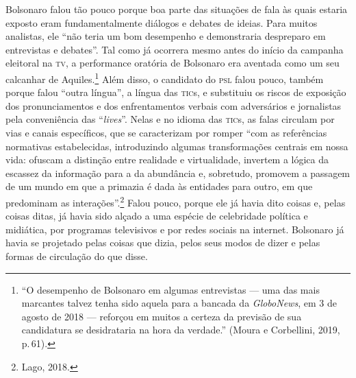 Bolsonaro falou tão pouco porque boa parte das situações de fala às
quais estaria exposto eram fundamentalmente diálogos e debates de
ideias. Para muitos analistas, ele ``não teria um bom desempenho e
demonstraria despreparo em entrevistas e debates''. Tal como já ocorrera
mesmo antes do início da campanha eleitoral na \textsc{tv}, a performance
oratória de Bolsonaro era aventada como um seu calcanhar de
Aquiles.\footnote{``O desempenho de Bolsonaro em algumas entrevistas ---
  uma das mais marcantes talvez tenha sido aquela para a bancada da
  \emph{GloboNews}, em 3 de agosto de 2018 --- reforçou em muitos a
  certeza da previsão de sua candidatura se desidrataria na hora da
  verdade.'' (Moura e Corbellini, 2019, p.\,61).} Além disso, o
candidato do \textsc{psl} falou pouco, também porque falou ``outra língua'', a
língua das \textsc{tic}s, e substituiu os riscos de exposição dos
pronunciamentos e dos enfrentamentos verbais com adversários e
jornalistas pela conveniência das ``\emph{lives}''. Nelas e no idioma
das \textsc{tic}s, as falas circulam por vias e canais específicos, que se
caracterizam por romper ``com as referências normativas estabelecidas,
introduzindo algumas transformações centrais em nossa vida: ofuscam a
distinção entre realidade e virtualidade, invertem a lógica da escassez
da informação para a da abundância e, sobretudo, promovem a passagem de
um mundo em que a primazia é dada às entidades para outro, em que
predominam as interações''.\footnote{Lago, 2018.} Falou pouco, porque
ele já havia dito coisas e, pelas coisas ditas, já havia sido alçado a
uma espécie de celebridade política e midiática, por programas
televisivos e por redes sociais na internet. Bolsonaro já havia se
projetado pelas coisas que dizia, pelos seus modos de dizer e pelas
formas de circulação do que disse.

